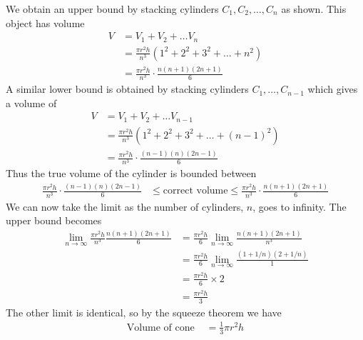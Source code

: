 We obtain an upper bound by stacking cylinders $C_1,C_2,\dots,C_n$ as shown. This object
has volume
\begin{align*}
  V &= V_1 + V_2 + \dots V_n \\
  &= \frac{\pi r^2h}{n^3} \left(1^2 + 2^2 + 3^2 + \dots + n^2 \right) \\
  &= \frac{\pi r^2h}{n^3} \cdot \frac{n(n+1)(2n+1)}{6}
\end{align*}
A similar lower bound is obtained by stacking cylinders $C_1,\dots,C_{n-1}$ which gives a
volume of
\begin{align*}
  V &= V_1 + V_2 + \dots V_{n-1} \\
  &= \frac{\pi r^2h}{n^3} \left(1^2 + 2^2 + 3^2 + \dots + (n-1)^2 \right) \\
  &= \frac{\pi r^2h}{n^3} \cdot \frac{(n-1)(n)(2n-1)}{6}
\end{align*}
Thus the true volume of the cylinder is bounded between
\begin{align*}
  \frac{\pi r^2h}{n^3} \cdot \frac{(n-1)(n)(2n-1)}{6}
  & \leq \text{correct volume}
  \leq \frac{\pi r^2h}{n^3} \cdot \frac{n(n+1)(2n+1)}{6}
\end{align*}
We can now take the limit as the number of cylinders, $n$, goes to infinity. The upper
bound becomes
\begin{align*}
  \lim_{n \to \infty} \frac{\pi r^2h}{n^3} \frac{n(n+1)(2n+1)}{6}
  &= \frac{\pi r^2h}{6} \lim_{n\to\infty} \frac{n(n+1)(2n+1)}{n^3} \\
  &= \frac{\pi r^2h}{6} \lim_{n\to\infty} \frac{(1+1/n)(2+1/n)}{1} \\
  &= \frac{\pi r^2h}{6} \times 2 \\
  &= \frac{\pi r^2h}{3}
\end{align*}
The other limit is identical, so by the squeeze theorem we have
\begin{align*}
  \text{Volume of cone } &= \frac{1}{3} \pi r^2h
\end{align*}

